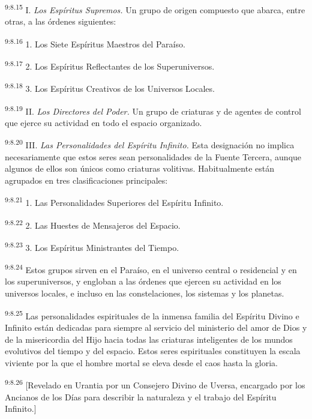 \par
\textsuperscript{9:8.15} I. \textit{Los Espíritus Supremos.} Un grupo de origen compuesto que abarca, entre otras, a las órdenes siguientes:

\par
\textsuperscript{9:8.16} 1. Los Siete Espíritus Maestros del Paraíso.

\par
\textsuperscript{9:8.17} 2. Los Espíritus Reflectantes de los Superuniversos.

\par
\textsuperscript{9:8.18} 3. Los Espíritus Creativos de los Universos Locales.

\par
\textsuperscript{9:8.19} II. \textit{Los Directores del Poder.} Un grupo de criaturas y de agentes de control que ejerce su actividad en todo el espacio organizado.

\par
\textsuperscript{9:8.20} III. \textit{Las Personalidades del Espíritu Infinito.} Esta designación no implica necesariamente que estos seres sean personalidades de la Fuente Tercera, aunque algunos de ellos son únicos como criaturas volitivas. Habitualmente están agrupados en tres clasificaciones principales:

\par
\textsuperscript{9:8.21} 1. Las Personalidades Superiores del Espíritu Infinito.

\par
\textsuperscript{9:8.22} 2. Las Huestes de Mensajeros del Espacio.

\par
\textsuperscript{9:8.23} 3. Los Espíritus Ministrantes del Tiempo.

\par
\textsuperscript{9:8.24} Estos grupos sirven en el Paraíso, en el universo central o residencial y en los superuniversos, y engloban a las órdenes que ejercen su actividad en los universos locales, e incluso en las constelaciones, los sistemas y los planetas.

\par
\textsuperscript{9:8.25} Las personalidades espirituales de la inmensa familia del Espíritu Divino e Infinito están dedicadas para siempre al servicio del ministerio del amor de Dios y de la misericordia del Hijo hacia todas las criaturas inteligentes de los mundos evolutivos del tiempo y del espacio. Estos seres espirituales constituyen la escala viviente por la que el hombre mortal se eleva desde el caos hasta la gloria.

\par
\textsuperscript{9:8.26} [Revelado en Urantia por un Consejero Divino de Uversa, encargado por los Ancianos de los Días para describir la naturaleza y el trabajo del Espíritu Infinito.]